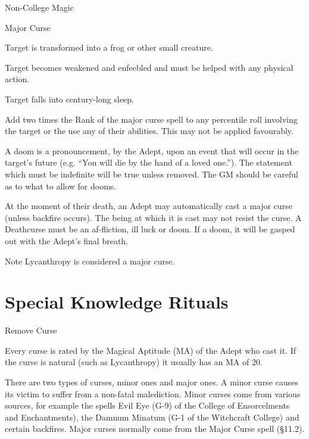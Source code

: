 \begin{Chapter}{Non-College Magic}
\begin{ritual}{Major Curse}
\begin{effects}
\begin{Enumerate}
\item Target is transformed into a frog or other small creature.

\item Target  becomes  weakened  and  enfeebled  and 
must be helped with any physical action. 

\item Target falls into century-long sleep. 
\end{Enumerate}

\begin{Description}
\item[Ill Luck] Add two times the Rank of the major curse spell to any
  percentile roll involving the target or the use any of their
  abilities. This may not be applied favourably.

\item[Doom] A doom is a pronouncement, by the Adept, upon an event
  that will occur in the target’s future (e.g.  “You will die by the
  hand of a loved one.”).  The statement which must be indefinite will
  be true unless removed.  The GM should be careful as to what to
  allow for dooms.

\item[Death-curse] At the moment of their death, an Adept may
  automatically cast a major curse (unless backfire occurs).  The
  being at which it is cast may not resist the curse.  A Deathcurse
  must be an af-fliction, ill luck or doom.  If a doom, it will be
  gasped out with the Adept’s final breath.
\end{Description}
Note Lycanthropy is considered a major curse.
\end{effects}
\end{ritual}


\section{Special Knowledge Rituals}


\begin{ritual}{Remove Curse}

\begin{effects}
Every curse is rated by the Magical Aptitude (MA) of the Adept who
cast it. If the curse is natural (such as Lycanthropy) it usually has
an MA of 20.

There are two types of curses, minor ones and major ones.  A minor
curse causes its victim to suffer from a non-fatal malediction.  Minor
curses come from various sources, for example the spells Evil Eye (G-9)
of the College of Ensorcelments and Enchantments), the Damnum Minatum
(G-1 of the Witchcraft College) and certain backfires.  Major curses
normally come from the Major Curse spell (§11.2).


\end{effects}
\end{ritual}
\end{Chapter}
